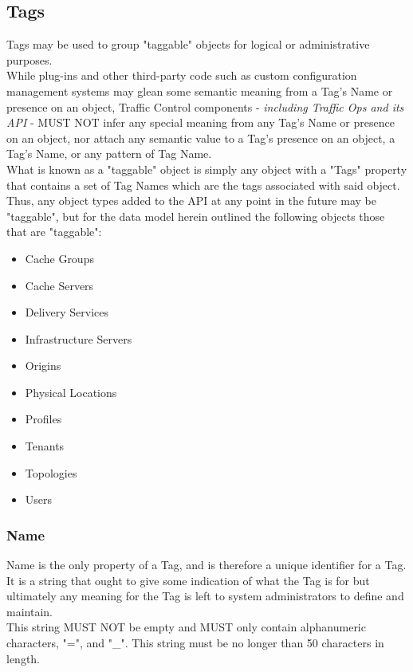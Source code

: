 %
%

\subsection{Tags}
Tags may be used to group "taggable" objects for logical or administrative
purposes.\\
While plug-ins and other third-party code such as custom configuration
management systems may glean some semantic meaning from a Tag's Name or
presence on an object, Traffic Control components - \emph{including Traffic Ops
and its API} - MUST NOT infer any special meaning from any Tag's Name or
presence on an object, nor attach any semantic value to a Tag's presence on an
object, a Tag's Name, or any pattern of Tag Name.\\
What is known as a "taggable" object is simply any object with a "Tags"
property that contains a set of Tag Names which are the tags associated with
said object. Thus, any object types added to the API at any point in the future
may be "taggable", but for the data model herein outlined the following objects
those that are "taggable":

\begin{itemize}
	\item Cache Groups
	\item Cache Servers
	\item Delivery Services
	\item Infrastructure Servers
	\item Origins
	\item Physical Locations
	\item Profiles
	\item Tenants
	\item Topologies
	\item Users
\end{itemize}

\subsubsection{Name}
Name is the only property of a Tag, and is therefore a unique identifier for
a Tag. It is a string that ought to give some indication of what the Tag is for
but ultimately any meaning for the Tag is left to system administrators to
define and maintain.\\
This string MUST NOT be empty and MUST only contain alphanumeric characters,
"=", and "\_". This string must be no longer than 50 characters in length.
